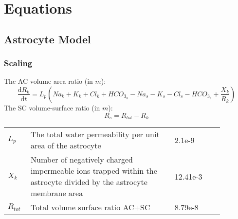 \section{Equations}

\subsection{Astrocyte Model}

\subsubsection{Scaling}
%
The  \gls{AC}  volume-area ratio (in $m$):
\begin{equation} \label{eq:R_k}
\dfrac{\mathrm{d}R_k}{\mathrm{d}t}= L_p \left( Na_k+K_k+Cl_k+HCO_{3_k}-Na_s-K_s-Cl_s-HCO_{3_{s}}+\frac{X_k}{R_k}\right)
\end{equation}
%
The \gls{SC} volume-surface ratio  (in $m$):
\begin{equation} \label{eq:R_tot}
R_s = R_{tot} - R_k  
\end{equation}
%
\begin{table}[h!]
\centering
\begin{tabular}{| p{0.09\linewidth} | >{\footnotesize} p{0.6\linewidth} | >{\footnotesize} p{0.17\linewidth} | >{\footnotesize} p{0.02\linewidth} |}
\arrayrulecolor{lightgrey}\hline
$L_p$ 			& The total water permeability per unit area of the astrocyte 			& 2.1e-9 \mperuMs &  \cite{Ostby2009}  \\
$X_k$			& Number of negatively charged impermeable ions trapped within the astrocyte divided by the astrocyte membrane area								& 12.41e-3 \uMm & \cite{Ostby2009}  \\
$R_{tot}$ 		& Total volume surface ratio AC+SC   		& 8.79e-8 \m & \cite{Ostby2009}  \\
\hline
\end{tabular}
\end{table}
\newpage
